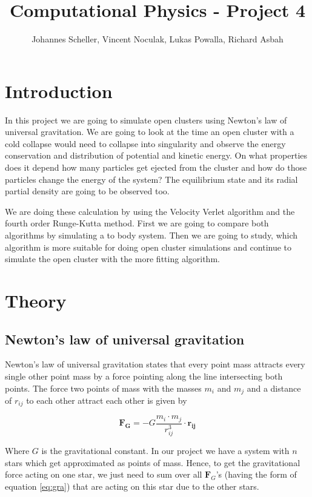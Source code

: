 \documentclass[10pt,a4paper]{article}
\author{Johannes Scheller, Vincent Noculak, Lukas Powalla, Richard Asbah}
\title{Computational Physics - Project 4}
\begin{document}
\maketitle
\newpage
\tableofcontents
\newpage


\section{Introduction}

In this project we are going to simulate open clusters using Newton's law of universal gravitation. We are going to look at the time an open cluster with a cold collapse would need to collapse into singularity and observe the energy conservation and distribution of potential and kinetic energy. On what properties does it depend how many particles get ejected from the cluster and how do those particles change the energy of the system? The equilibrium state and its radial partial density are going to be observed too.

We are doing these calculation by using the Velocity Verlet algorithm and the fourth order Runge-Kutta method. First we are going to compare both algorithms by simulating a to body system. Then we are going to study, which algorithm is more suitable for doing open cluster simulations and continue to simulate the open cluster with the more fitting algorithm.

\section{Theory}

\subsection{Newton's law of universal gravitation}

Newton's law of universal gravitation states that every point mass attracts every single other point mass by a force pointing along the line intersecting both points. The force two points of mass with the masses $m_i$ and $m_j$ and a distance of $r_{ij}$ to each other attract each other is given by

\begin{equation}	
\label{eq:gra}
\mathbf{F_G} = - G \frac{m_i \cdot m_j}{r_{ij}^3} \cdot \mathbf{r_{ij}}
\end{equation}

Where $G$ is the gravitational constant. In our project we have a system with $n$ stars which get approximated as points of mass. Hence, to get the gravitational force acting on one star, we just need to sum over all $\mathbf{F}_G$'s (having the form of equation \eqref{eq:gra}) that are acting on this star due to the other stars.
\end{document}

